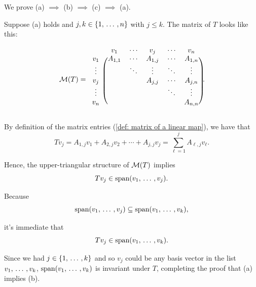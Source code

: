 \begin{prf}
  We prove (a) $\implies$ (b) $\implies$ (c) $\implies$ (a).

  \StepOne Suppose (a) holds and $j, k \in \{1, {\, \ldots \,\,}, n \}$ with $j \leq k$. The matrix of $T$ looks like this:

  \begin{minipage}{\linewidth}
  \begin{equation}
  \mathcal{M} (T) =
  \begin{blockarray}{cccccc}
    & v_1     & \cdots & v_j      & \cdots & v_n     \\
    \begin{block}{c(ccccc)}
      v_1    & A_{1,1} & \cdots & A_{1,j}  & \cdots & A_{1,n} \\
      \vdots &         & \ddots & \vdots   & \ddots & \vdots  \\
      v_j    &         &        & A_{j,j}  & \cdots & A_{j,n}  \\
      \vdots &         &        &          & \ddots & \vdots  \\
      v_n    &         &        &          &        & A_{n,n} \\
    \end{block}
  \end{blockarray}.
  \end{equation}
  \end{minipage}

  By definition of the matrix entries (\ref{def: matrix of a linear map}), we have that
  \begin{equation}
    T v_j = A_{1,j} v_1 + A_{2,j} v_2 + \cdots + A_{j,j} v_j = \sum_{\ell=1}^{j} A_{\ell,j} v_\ell.
  \end{equation}

  Hence, the upper-triangular structure of $\mathcal{M}(T)$ implies
  \begin{equation}
    T v_j \in \operatorname{span} (v_1, {\, \ldots \,\,}, v_j).
  \end{equation}

  Because
  \begin{equation}
    \operatorname{span} (v_1, {\, \ldots \,\,}, v_j) \subseteq \operatorname{span} (v_1, {\, \ldots \,\,}, v_k),
  \end{equation}

  it's immediate that
  \begin{equation}
    T v_j \in \operatorname{span} (v_1, {\, \ldots \,\,}, v_k).
  \end{equation}

  Since we had $j \in \{1, {\, \ldots \,\,}, k\}$ and so $v_j$ could be any basis vector in the list $v_1, {\, \ldots \,\,}, v_k$, $\operatorname{span} (v_1, {\, \ldots \,\,}, v_k)$ is invariant under $T$, completing the proof that (a) implies (b).


\end{prf}
